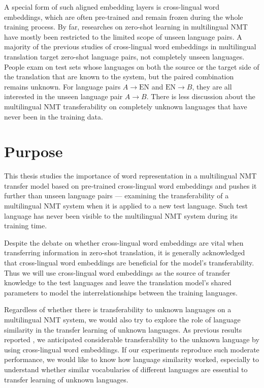 \documentclass[thesis]{cluu}
\begin{document}
A special form of such aligned embedding layers is cross-lingual word embeddings, which are often pre-trained and remain frozen during the whole training process. By far, researches on zero-shot learning in multilingual NMT have mostly been restricted to the limited scope of unseen language pairs. A majority of the previous studies of cross-lingual word embeddings in multilingual translation target zero-shot language pairs, not completely unseen languages. People exam on test sets whose languages on both the source or the target side of the translation that are known to the system, but the paired combination remains unknown. For language pairs $A \rightarrow \text{EN}$ and $\text{EN} \rightarrow B$, they are all interested in the unseen language pair $A \rightarrow B$. There is less discussion about the multilingual NMT transferability on completely unknown languages that have never been in the training data.

\section{Purpose}

This thesis studies the importance of word representation in a multilingual NMT transfer model based on pre-trained cross-lingual word embeddings \parencite{Bojanowski:2016aa,Ammar:2016aa,Joulin:2018aa,Ruder:2019aa} and pushes it further than unseen language pairs --- examining the transferability of a multilingual NMT system when it is applied to a new test language. Such test language has never been visible to the multilingual NMT system during its training time.

Despite the debate on whether cross-lingual word embeddings are vital when transferring information in zero-shot translation, it is generally acknowledged that cross-lingual word embeddings are beneficial for the model's transferability. Thus we will use cross-lingual word embeddings as the source of transfer knowledge to the test languages and leave the translation model's shared parameters to model the interrelationships between the training languages.

Regardless of whether there is transferability to unknown languages on a multilingual NMT system, we would also try to explore the role of language similarity in the transfer learning of unknown languages. As previous results reported \parencite{Qi:2018aa}, we anticipated considerable transferability to the unknown language by using cross-lingual word embeddings. If our experiments reproduce such moderate performance, we would like to know how language similarity worked, especially to understand whether similar vocabularies of different languages are essential to transfer learning of unknown languages.
\end{document}

